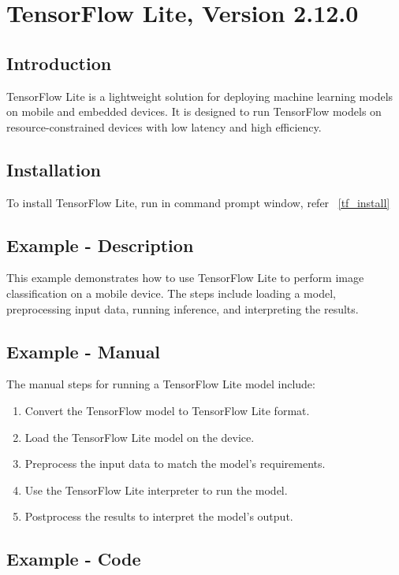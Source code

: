 \section{TensorFlow Lite, Version 2.12.0}
\subsection{Introduction}
TensorFlow Lite is a lightweight solution for deploying machine learning models on mobile and embedded devices. It is designed to run TensorFlow models on resource-constrained devices with low latency and high efficiency. \cite{TensorFlowLiteGuide:2024}

\subsection{Installation}

To install TensorFlow Lite, run  in command prompt window, refer ~\ref{tf_install}

\subsection{Example - Description}

This example demonstrates how to use TensorFlow Lite to perform image classification on a mobile device. The steps include loading a model, preprocessing input data, running inference, and interpreting the results.

\subsection{Example - Manual}

The manual steps for running a TensorFlow Lite model include:

\begin{enumerate}
	\item Convert the TensorFlow model to TensorFlow Lite format.
	\item Load the TensorFlow Lite model on the device.
	\item Preprocess the input data to match the model’s requirements.
	\item Use the TensorFlow Lite interpreter to run the model.
	\item Postprocess the results to interpret the model’s output.
\end{enumerate}

\subsection{Example - Code}

